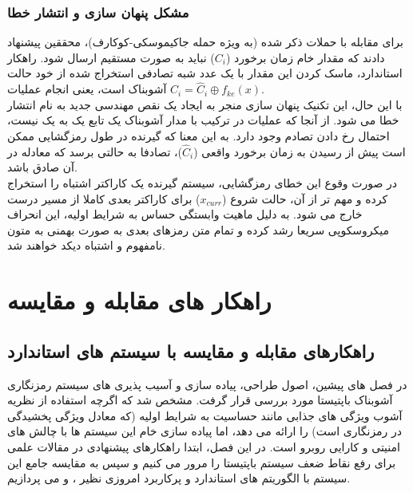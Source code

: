 \documentclass[12pt]{report}
\begin{document}
\subsection[مشکل پنهان سازی و انتشار خطا]{مشکل پنهان سازی و انتشار خطا}
برای مقابله با حملات ذکر شده (به ویژه حمله جاکیموسکی-کوکارف)، محققین پیشنهاد دادند که مقدار خام 
زمان برخورد ($C_i$) نباید به صورت مستقیم ارسال شود. راهکار استاندارد، ماسک کردن این مقدار با یک 
عدد شبه تصادفی استخراج شده از خود حالت آشوبناک است، یعنی انجام عملیات $C_i = \hat{C}_i \oplus f_{ke}(x)$.
\\\noindent
با این حال، این تکنیک پنهان سازی منجر به ایجاد یک نقص مهندسی جدید به نام انتشار خطا 
 می شود. از آنجا که عملیات  در ترکیب با مدار 
آشوبناک یک تابع یک به یک نیست، احتمال رخ دادن تصادم 
 وجود دارد. به این معنا که گیرنده در طول رمزگشایی ممکن است پیش از 
رسیدن به زمان برخورد واقعی ($\hat{C}_i$)، تصادفا به حالتی برسد که معادله  در آن صادق باشد.
\\\noindent
در صورت وقوع این خطای رمزگشایی، سیستم گیرنده یک کاراکتر اشتباه را استخراج کرده و مهم تر از آن، 
حالت شروع ($x_{curr}$) برای کاراکتر بعدی کاملا از مسیر درست خارج می شود. به دلیل ماهیت وابستگی 
حساس به شرایط اولیه، این انحراف میکروسکوپی سریعا رشد کرده 
و تمام متن رمزهای بعدی به صورت بهمنی به متون نامفهوم و 
اشتباه دیکد خواهند شد.

\chapter{راهکار های مقابله و مقایسه}

\section{راهکارهای مقابله و مقایسه با سیستم های استاندارد}

در فصل های پیشین، اصول طراحی، پیاده سازی و آسیب پذیری های سیستم رمزنگاری آشوبناک باپتیستا 
مورد بررسی قرار گرفت. مشخص شد که اگرچه استفاده از نظریه آشوب ویژگی های جذابی مانند حساسیت به 
شرایط اولیه (که معادل ویژگی پخشیدگی در رمزنگاری است) را ارائه می دهد، اما پیاده سازی خام این 
سیستم ها با چالش های امنیتی و کارایی روبرو است. در این فصل، ابتدا راهکارهای پیشنهادی در 
مقالات علمی برای رفع نقاط ضعف سیستم باپتیستا را مرور می کنیم و سپس به مقایسه جامع این سیستم 
با الگوریتم های استاندارد و پرکاربرد امروزی نظیر ،  و  می پردازیم.
\end{document}
